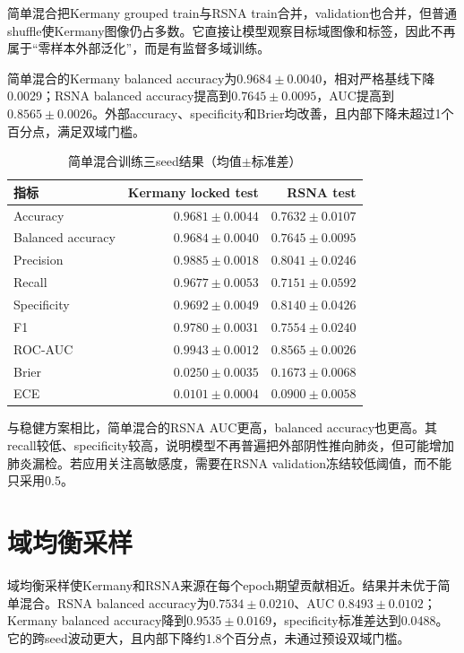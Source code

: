 简单混合把Kermany grouped train与RSNA train合并，validation也合并，但普通shuffle使Kermany图像仍占多数。它直接让模型观察目标域图像和标签，因此不再属于“零样本外部泛化”，而是有监督多域训练。

简单混合的Kermany balanced accuracy为$0.9684\pm0.0040$，相对严格基线下降0.0029；RSNA balanced accuracy提高到$0.7645\pm0.0095$，AUC提高到$0.8565\pm0.0026$。外部accuracy、specificity和Brier均改善，且内部下降未超过1个百分点，满足双域门槛。

\begin{table}[H]
\centering
\caption{简单混合训练三seed结果（均值$\pm$标准差）}
\begin{tabular}{lrr}
\toprule 指标 & Kermany locked test & RSNA test\\\midrule
Accuracy & $0.9681\pm0.0044$ & $0.7632\pm0.0107$\\
Balanced accuracy & $0.9684\pm0.0040$ & $0.7645\pm0.0095$\\
Precision & $0.9885\pm0.0018$ & $0.8041\pm0.0246$\\
Recall & $0.9677\pm0.0053$ & $0.7151\pm0.0592$\\
Specificity & $0.9692\pm0.0049$ & $0.8140\pm0.0426$\\
F1 & $0.9780\pm0.0031$ & $0.7554\pm0.0240$\\
ROC-AUC & $0.9943\pm0.0012$ & $0.8565\pm0.0026$\\
Brier & $0.0250\pm0.0035$ & $0.1673\pm0.0068$\\
ECE & $0.0101\pm0.0004$ & $0.0900\pm0.0058$\\\bottomrule
\end{tabular}
\end{table}

与稳健方案相比，简单混合的RSNA AUC更高，balanced accuracy也更高。其recall较低、specificity较高，说明模型不再普遍把外部阴性推向肺炎，但可能增加肺炎漏检。若应用关注高敏感度，需要在RSNA validation冻结较低阈值，而不能只采用0.5。

\section{域均衡采样}

域均衡采样使Kermany和RSNA来源在每个epoch期望贡献相近。结果并未优于简单混合。RSNA balanced accuracy为$0.7534\pm0.0210$、AUC $0.8493\pm0.0102$；Kermany balanced accuracy降到$0.9535\pm0.0169$，specificity标准差达到0.0488。它的跨seed波动更大，且内部下降约1.8个百分点，未通过预设双域门槛。

